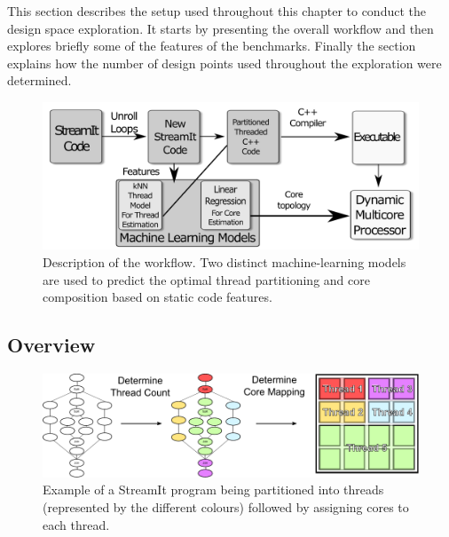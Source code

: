 This section describes the setup used throughout this chapter to conduct the design space exploration.
It starts by presenting the overall workflow and then explores briefly some of the features of the benchmarks.
Finally the section explains how the number of design points used throughout the exploration were determined.

\begin{figure}[t]
    \centering
    \includegraphics[width=1\textwidth]{streamit-paper/graphics/explanation3.pdf}
    \caption{Description of the workflow.
    Two distinct machine-learning models are used to predict the optimal thread partitioning and core composition based on static code features.}
    \label{fig:overview}
\end{figure}

\subsection{Overview}

\begin{figure}[t]
    \centering
    \includegraphics[width=1\textwidth]{streamit-paper/graphics/examplestrem.pdf}
    \caption{Example of a StreamIt program being partitioned into threads (represented by the different colours) followed by assigning cores to each thread.}
    \label{fig:examplestream}
\end{figure}

